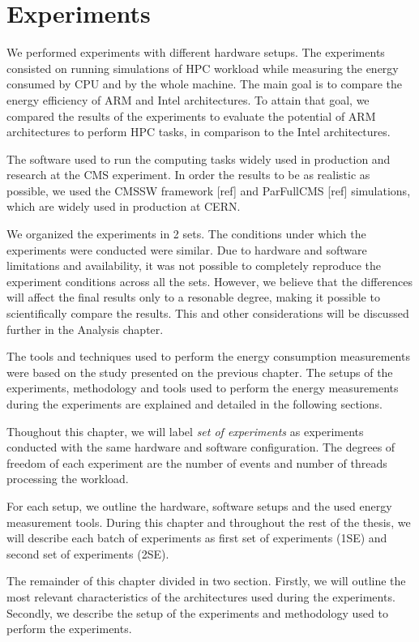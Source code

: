 \chapter{Experiments}


We performed experiments with different hardware setups. The experiments consisted on running simulations of HPC workload while measuring the energy consumed by CPU and by the whole machine.
The main goal is to compare the energy efficiency of ARM and Intel architectures. To attain that goal, we compared the results
of the experiments to evaluate the potential of ARM architectures to perform HPC tasks, in
comparison to the Intel architectures.

The software used to run the computing tasks
widely used in production and research at the CMS experiment. In order the results to be as realistic as possible, we used the CMSSW framework [ref] and ParFullCMS [ref] simulations, which are widely used in production at CERN.

We organized the experiments in 2 sets. The conditions under which the
experiments were conducted were similar. Due to hardware and software
limitations and availability, it was not possible to completely reproduce the experiment
conditions across all the sets. However, we believe that the differences will
affect the final results only to a resonable degree, making it possible to scientifically compare the results. This and other considerations will be discussed further in the Analysis chapter. 

The tools and techniques used to perform the energy
consumption measurements were based on the study presented on the previous
chapter. The setups of the experiments, methodology and tools used to perform the energy
measurements during the experiments are explained and detailed in the following
sections.

Thoughout this chapter, we will label \textit{set of experiments} as experiments conducted with
the same hardware and software configuration. The degrees of freedom of each
experiment are the number of events and number of threads processing the workload.
 
For each setup, we outline the hardware, software setups and the used energy measurement tools. 
During this chapter and throughout the rest of the thesis, we will describe
each batch of experiments as first set of experiments (1SE) and second set of experiments (2SE).

The remainder of this chapter divided in two section. Firstly, we will outline the most relevant characteristics of the
architectures used during the experiments.  Secondly, we describe
the setup of the experiments and methodology used to perform the experiments. 

